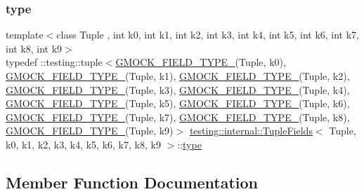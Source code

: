 \subsubsection{\texorpdfstring{type}{type}}
{\footnotesize\ttfamily template$<$class Tuple , int k0, int k1, int k2, int k3, int k4, int k5, int k6, int k7, int k8, int k9$>$ \\
typedef \+::testing\+::tuple$<$\mbox{\hyperlink{gmock-generated-matchers_8h_acf3e27de83a73f0d873da1cd471e505b}{G\+M\+O\+C\+K\+\_\+\+F\+I\+E\+L\+D\+\_\+\+T\+Y\+P\+E\+\_\+}}(Tuple, k0), \mbox{\hyperlink{gmock-generated-matchers_8h_acf3e27de83a73f0d873da1cd471e505b}{G\+M\+O\+C\+K\+\_\+\+F\+I\+E\+L\+D\+\_\+\+T\+Y\+P\+E\+\_\+}}(Tuple, k1), \mbox{\hyperlink{gmock-generated-matchers_8h_acf3e27de83a73f0d873da1cd471e505b}{G\+M\+O\+C\+K\+\_\+\+F\+I\+E\+L\+D\+\_\+\+T\+Y\+P\+E\+\_\+}}(Tuple, k2), \mbox{\hyperlink{gmock-generated-matchers_8h_acf3e27de83a73f0d873da1cd471e505b}{G\+M\+O\+C\+K\+\_\+\+F\+I\+E\+L\+D\+\_\+\+T\+Y\+P\+E\+\_\+}}(Tuple, k3), \mbox{\hyperlink{gmock-generated-matchers_8h_acf3e27de83a73f0d873da1cd471e505b}{G\+M\+O\+C\+K\+\_\+\+F\+I\+E\+L\+D\+\_\+\+T\+Y\+P\+E\+\_\+}}(Tuple, k4), \mbox{\hyperlink{gmock-generated-matchers_8h_acf3e27de83a73f0d873da1cd471e505b}{G\+M\+O\+C\+K\+\_\+\+F\+I\+E\+L\+D\+\_\+\+T\+Y\+P\+E\+\_\+}}(Tuple, k5), \mbox{\hyperlink{gmock-generated-matchers_8h_acf3e27de83a73f0d873da1cd471e505b}{G\+M\+O\+C\+K\+\_\+\+F\+I\+E\+L\+D\+\_\+\+T\+Y\+P\+E\+\_\+}}(Tuple, k6), \mbox{\hyperlink{gmock-generated-matchers_8h_acf3e27de83a73f0d873da1cd471e505b}{G\+M\+O\+C\+K\+\_\+\+F\+I\+E\+L\+D\+\_\+\+T\+Y\+P\+E\+\_\+}}(Tuple, k7), \mbox{\hyperlink{gmock-generated-matchers_8h_acf3e27de83a73f0d873da1cd471e505b}{G\+M\+O\+C\+K\+\_\+\+F\+I\+E\+L\+D\+\_\+\+T\+Y\+P\+E\+\_\+}}(Tuple, k8), \mbox{\hyperlink{gmock-generated-matchers_8h_acf3e27de83a73f0d873da1cd471e505b}{G\+M\+O\+C\+K\+\_\+\+F\+I\+E\+L\+D\+\_\+\+T\+Y\+P\+E\+\_\+}}(Tuple, k9)$>$ \mbox{\hyperlink{classtesting_1_1internal_1_1TupleFields}{testing\+::internal\+::\+Tuple\+Fields}}$<$ Tuple, k0, k1, k2, k3, k4, k5, k6, k7, k8, k9 $>$\+::\mbox{\hyperlink{classtesting_1_1internal_1_1TupleFields_a5480877377ebc94bf3a6c6cab5c369bc}{type}}}



\subsection{Member Function Documentation}
\mbox{\label{classtesting_1_1internal_1_1TupleFields_a020eefb4630e6dffe8bcadd0a70b1bab}} 
